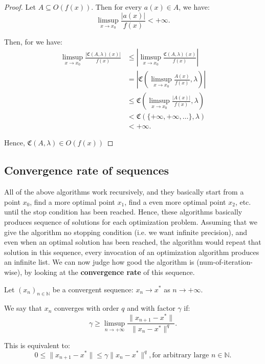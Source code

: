 \begin{proof}
  Let \( A\subseteq O(f(x)) \). Then for every \( a(x) \in A \), we have:
  \[
    \limsup_{x \to x_{0}} \frac{|a(x)|}{f(x)} < +\infty
  .\] 

  Then, for we have:
  \begin{align*}
    \limsup_{x \to x_{0}} \frac{|\mathfrak{C}(A, \lambda)(x)|}{f(x)} 
    &\le
    \left| \limsup_{x \to x_{0}} \frac{\mathfrak{C}(A, \lambda)(x)}{f(x)}
    \right| \\
    &= \left|\mathfrak{C}\left(\limsup_{x \to x_{0}}\frac{A(x)}{f(x)}, \lambda
    \right)\right|\\
    & \le \mathfrak{C} \left( \limsup_{x \to x_{0}} \frac{|A(x)|}{f(x)}, \lambda
    \right) \\
    &< \mathfrak{C}(\{+\infty, +\infty, \ldots \}, \lambda )\\
    &< +\infty
  .\end{align*}

  Hence, \( \mathfrak{C}(A, \lambda) \in O(f(x)) \)
\end{proof}
\fi


\subsection{Convergence rate of sequences} %
\label{sub:Convergence rate of sequences}

All of the above algorithms work recursively, and they basically start from a
point \( x_{0} \), find a more optimal point \( x_{1} \), find a even more
optimal point \( x_{2} \), etc. until the stop condition has been reached.
Hence, these algorithms basically produces sequence of solutions for each
optimization problem. Assuming that we give the algorithm no stopping condition
(i.e. we want infinite precision), and even when an optimal solution has been
reached, the algorithm would repeat that solution in this sequence, every
invocation of an optimization algorithm produces an infinite list. We can now
judge how good the algorithm is (num-of-iteration-wise), by looking at the
\textbf{convergence rate} of this sequence.

\begin{definition}
\label{def:Convergence rate of a sequence}
  Let \( (x_{n})_{n \in \mathbb{N}} \) be a convergent sequence: \( x_{n}\to
  x^{*} \) as \( n \to +\infty \).

  We say that \( x_{n} \) converges with order \( q \) and with factor \( \gamma  \)
  if:
  \[
    \gamma \ge  \limsup_{n \to +\infty} \frac{\|x_{n + 1} -
    x^{*}\|}{\|x_{n} - x^{*}\|^{q}}
  .\] 

  This is equivalent to:
  \[
    0 \le \|x_{n + 1} - x^{*}\| \le \gamma \|x_{n} - x^{*}\|^{q}, \text{for
    arbitrary large } n \in \mathbb{N}
  .\] 
\end{definition}

